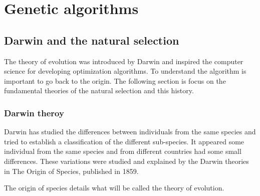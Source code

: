 \chapter{Genetic algorithms }\label{chap:EA}

\minitoc


\section{Darwin and the natural selection }

The theory of evolution was introduced by Darwin and inspired the computer science for developing optimization algorithms. To understand the algorithm is important to go back to the origin.
The following  section is  focus on the  fundamental theories of the  natural selection and this history. 
\subsection{Darwin theroy } \label{sec:GA}

Darwin has studied the differences between individuals from the same species and tried to establish a classification of the different sub-species. It appeared some individual from the same species and from different countries had some small differences. These variations were studied and explained by the Darwin theories in The Origin of Species, published in 1859. 

The origin of species details what will be called the theory of evolution. 


